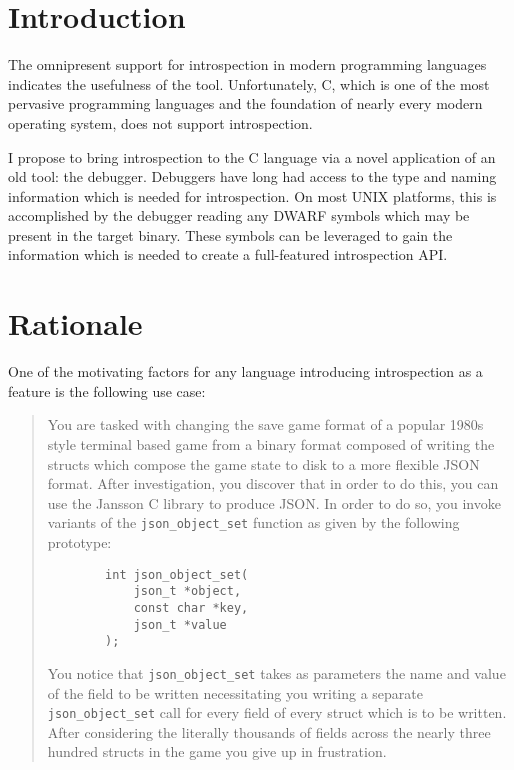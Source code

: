 \documentclass[twocolumn,draft]{article}
\begin{document}
{}

\section{Introduction}
The omnipresent support for introspection in modern programming languages
indicates the usefulness of the tool. \cite{java-reflect, ruby-introspect,
python-introspect, perl-introspect} Unfortunately, C, which is one of the most
pervasive programming languages and the foundation of nearly every modern
operating system, does not support introspection.

I propose to bring introspection to the C language via a novel application of an
old tool: the debugger. Debuggers have long had access to the type and naming
information which is needed for introspection. On most UNIX platforms, this is
accomplished by the debugger reading any DWARF \cite{dwarf} symbols which may
be present in the target binary. These symbols can be leveraged to gain the
information which is needed to create a full-featured introspection API.

\section{Rationale}
One of the motivating factors for any language introducing introspection as a
feature is the following use case:

\begin{quotation}
	You are tasked with changing the save game format of a popular 1980s style
	terminal based game from a binary format composed of writing the structs
	which compose the game state to disk to a more flexible JSON format. After
	investigation, you discover that in order to do this, you can use the
	Jansson \cite{jansson} C library to produce JSON. In order to do so, you
	invoke variants of the \texttt{json\_object\_set} function as given by the
	following prototype:
	\begin{verbatim}
		int json_object_set(
			json_t *object,
			const char *key,
			json_t *value
		);
	\end{verbatim}
	You notice that \texttt{json\_object\_set} takes as parameters the name and
	value of the field to be written necessitating you writing a separate
	\texttt{json\_object\_set} call for every field of every struct which is to
	be written. After considering the literally thousands of fields across the
	nearly three hundred structs in the game you give up in frustration.
\end{quotation}
\end{document}
